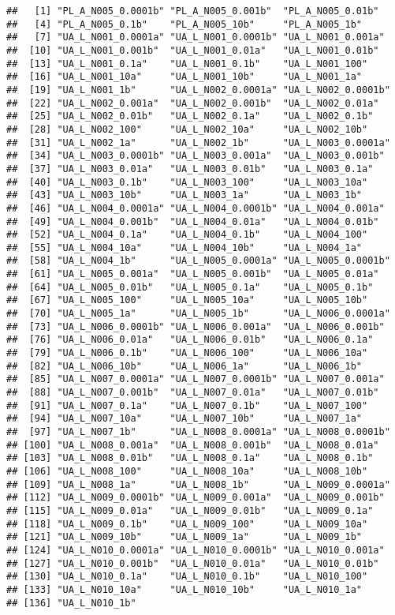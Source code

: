 \documentclass[table]{article}
\begin{document}
\begin{verbatim}
##   [1] "PL_A_N005_0.0001b" "PL_A_N005_0.001b"  "PL_A_N005_0.01b"  
##   [4] "PL_A_N005_0.1b"    "PL_A_N005_10b"     "PL_A_N005_1b"     
##   [7] "UA_L_N001_0.0001a" "UA_L_N001_0.0001b" "UA_L_N001_0.001a" 
##  [10] "UA_L_N001_0.001b"  "UA_L_N001_0.01a"   "UA_L_N001_0.01b"  
##  [13] "UA_L_N001_0.1a"    "UA_L_N001_0.1b"    "UA_L_N001_100"    
##  [16] "UA_L_N001_10a"     "UA_L_N001_10b"     "UA_L_N001_1a"     
##  [19] "UA_L_N001_1b"      "UA_L_N002_0.0001a" "UA_L_N002_0.0001b"
##  [22] "UA_L_N002_0.001a"  "UA_L_N002_0.001b"  "UA_L_N002_0.01a"  
##  [25] "UA_L_N002_0.01b"   "UA_L_N002_0.1a"    "UA_L_N002_0.1b"   
##  [28] "UA_L_N002_100"     "UA_L_N002_10a"     "UA_L_N002_10b"    
##  [31] "UA_L_N002_1a"      "UA_L_N002_1b"      "UA_L_N003_0.0001a"
##  [34] "UA_L_N003_0.0001b" "UA_L_N003_0.001a"  "UA_L_N003_0.001b" 
##  [37] "UA_L_N003_0.01a"   "UA_L_N003_0.01b"   "UA_L_N003_0.1a"   
##  [40] "UA_L_N003_0.1b"    "UA_L_N003_100"     "UA_L_N003_10a"    
##  [43] "UA_L_N003_10b"     "UA_L_N003_1a"      "UA_L_N003_1b"     
##  [46] "UA_L_N004_0.0001a" "UA_L_N004_0.0001b" "UA_L_N004_0.001a" 
##  [49] "UA_L_N004_0.001b"  "UA_L_N004_0.01a"   "UA_L_N004_0.01b"  
##  [52] "UA_L_N004_0.1a"    "UA_L_N004_0.1b"    "UA_L_N004_100"    
##  [55] "UA_L_N004_10a"     "UA_L_N004_10b"     "UA_L_N004_1a"     
##  [58] "UA_L_N004_1b"      "UA_L_N005_0.0001a" "UA_L_N005_0.0001b"
##  [61] "UA_L_N005_0.001a"  "UA_L_N005_0.001b"  "UA_L_N005_0.01a"  
##  [64] "UA_L_N005_0.01b"   "UA_L_N005_0.1a"    "UA_L_N005_0.1b"   
##  [67] "UA_L_N005_100"     "UA_L_N005_10a"     "UA_L_N005_10b"    
##  [70] "UA_L_N005_1a"      "UA_L_N005_1b"      "UA_L_N006_0.0001a"
##  [73] "UA_L_N006_0.0001b" "UA_L_N006_0.001a"  "UA_L_N006_0.001b" 
##  [76] "UA_L_N006_0.01a"   "UA_L_N006_0.01b"   "UA_L_N006_0.1a"   
##  [79] "UA_L_N006_0.1b"    "UA_L_N006_100"     "UA_L_N006_10a"    
##  [82] "UA_L_N006_10b"     "UA_L_N006_1a"      "UA_L_N006_1b"     
##  [85] "UA_L_N007_0.0001a" "UA_L_N007_0.0001b" "UA_L_N007_0.001a" 
##  [88] "UA_L_N007_0.001b"  "UA_L_N007_0.01a"   "UA_L_N007_0.01b"  
##  [91] "UA_L_N007_0.1a"    "UA_L_N007_0.1b"    "UA_L_N007_100"    
##  [94] "UA_L_N007_10a"     "UA_L_N007_10b"     "UA_L_N007_1a"     
##  [97] "UA_L_N007_1b"      "UA_L_N008_0.0001a" "UA_L_N008_0.0001b"
## [100] "UA_L_N008_0.001a"  "UA_L_N008_0.001b"  "UA_L_N008_0.01a"  
## [103] "UA_L_N008_0.01b"   "UA_L_N008_0.1a"    "UA_L_N008_0.1b"   
## [106] "UA_L_N008_100"     "UA_L_N008_10a"     "UA_L_N008_10b"    
## [109] "UA_L_N008_1a"      "UA_L_N008_1b"      "UA_L_N009_0.0001a"
## [112] "UA_L_N009_0.0001b" "UA_L_N009_0.001a"  "UA_L_N009_0.001b" 
## [115] "UA_L_N009_0.01a"   "UA_L_N009_0.01b"   "UA_L_N009_0.1a"   
## [118] "UA_L_N009_0.1b"    "UA_L_N009_100"     "UA_L_N009_10a"    
## [121] "UA_L_N009_10b"     "UA_L_N009_1a"      "UA_L_N009_1b"     
## [124] "UA_L_N010_0.0001a" "UA_L_N010_0.0001b" "UA_L_N010_0.001a" 
## [127] "UA_L_N010_0.001b"  "UA_L_N010_0.01a"   "UA_L_N010_0.01b"  
## [130] "UA_L_N010_0.1a"    "UA_L_N010_0.1b"    "UA_L_N010_100"    
## [133] "UA_L_N010_10a"     "UA_L_N010_10b"     "UA_L_N010_1a"     
## [136] "UA_L_N010_1b"
\end{verbatim}
\end{document}
